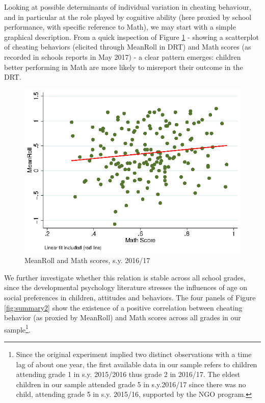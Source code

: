 \documentclass[authoryear, preprint, review, 12pt]{elsarticle}
\begin{document}
Looking at possible determinants of individual variation in cheating behaviour, and in particular at the role played by cognitive ability (here proxied by school performance, with specific reference to Math), we may start with a simple graphical description. From a quick inspection of Figure \ref{fig:cheatmath} - showing a scatterplot of cheating behaviors (elicited through MeanRoll in DRT) and Math scores (as recorded in schools reports in May 2017) - a clear pattern emerges: children better performing in Math are more likely to misreport their outcome in the DRT.

\begin{figure}
	\centering
	\includegraphics{figures/cheating_and_math.eps}
	\caption{\label{fig:cheatmath}MeanRoll and Math scores, s.y. 2016/17}
\end{figure}

We further investigate whether this relation is stable across all school grades, since the developmental psychology literature stresses the influences of age on social preferences in children, attitudes and behaviors.
The four panels of Figure \ref{fig:summary2} show the existence of a positive correlation between cheating behavior (as proxied by MeanRoll) and Math scores across all grades in our sample\footnote{Since the original experiment implied two distinct observations with a time lag of about one year, the first available data in our sample refers to children attending grade 1 in s.y. 2015/2016 thus grade 2 in 2016/17. The eldest children in our sample attended grade 5 in s.y.2016/17 since there was no child, attending grade 5 in s.y. 2015/16, supported by the NGO program.}. 
\end{document}

